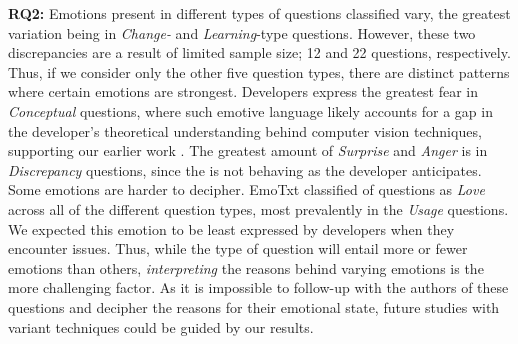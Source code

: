 \textbf{RQ2:} Emotions present in different types of questions classified vary, the greatest variation being in \textit{ Change-} and \textit{Learning}-type questions. However, these two discrepancies are a result of limited sample size; 12 and 22 questions, respectively. Thus, if we consider only the other five question types, there are distinct patterns where certain emotions are strongest. Developers express the greatest fear in \textit{Conceptual} questions, where such emotive language likely accounts for a gap in the developer's theoretical understanding behind computer vision techniques, supporting our earlier work \citep{Cummaudo:2020icse}. The greatest amount of \textit{Surprise} and \textit{Anger} is in \textit{Discrepancy} questions, since the  is not behaving as the developer anticipates. Some emotions are harder to decipher. EmoTxt classified \SEMPctLoveAverage{} of questions as \textit{Love} across all of the different question types, most prevalently in the \textit{ Usage} questions. We expected this emotion to be least expressed by developers when they encounter issues. Thus, while the type of question will entail more or fewer emotions than others, \textit{interpreting} the reasons behind varying emotions is the more challenging factor. As it is impossible to follow-up with the authors of these questions and decipher the reasons for their emotional state, future studies with variant techniques could be guided by our results.

